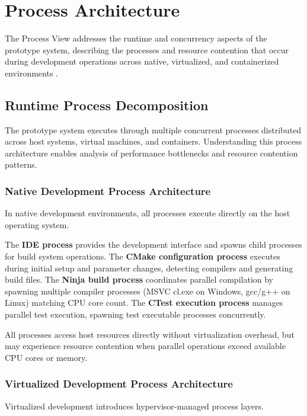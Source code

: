 \newpage
\section{Process Architecture}

The Process View addresses the runtime and concurrency aspects of the prototype system, describing the processes and resource contention that occur during development operations across native, virtualized, and containerized environments \citep{kruchten4+1ViewModel1995}.

\subsection{Runtime Process Decomposition}

The prototype system executes through multiple concurrent processes distributed across host systems, virtual machines, and containers.
Understanding this process architecture enables analysis of performance bottlenecks and resource contention patterns.

\subsubsection{Native Development Process Architecture}

In native development environments, all processes execute directly on the host operating system.

The \textbf{IDE process} provides the development interface and spawns child processes for build system operations.
The \textbf{CMake configuration process} executes during initial setup and parameter changes, detecting compilers and generating build files.
The \textbf{Ninja build process} coordinates parallel compilation by spawning multiple compiler processes (MSVC cl.exe on Windows, gcc/g++ on Linux) matching CPU core count.
The \textbf{CTest execution process} manages parallel test execution, spawning test executable processes concurrently.

All processes access host resources directly without virtualization overhead, but may experience resource contention when parallel operations exceed available CPU cores or memory.

\subsubsection{Virtualized Development Process Architecture}

Virtualized development introduces hypervisor-managed process layers.

